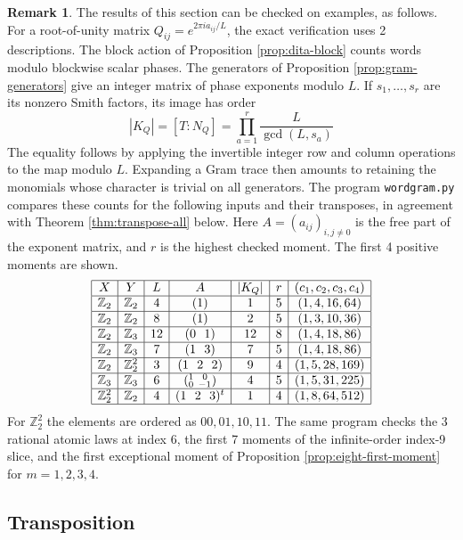 \documentclass[11pt,reqno]{amsart}
\theoremstyle{definition}
\newtheorem{remark}[thm]{Remark}
\numberwithin{equation}{section}
\begin{document}
\begin{remark}
The results of this section can be checked on examples, as follows. For a root-of-unity matrix $Q_{ij}=e^{2\pi i a_{ij}/L}$, the exact verification uses 2 descriptions. The block action of Proposition \ref{prop:dita-block} counts words modulo blockwise scalar phases. The generators of Proposition \ref{prop:gram-generators} give an integer matrix of phase exponents modulo $L$. If $s_1,\ldots,s_r$ are its nonzero Smith factors, its image has order
$$|K_Q|=[T:N_Q]=\prod_{a=1}^r\frac L{\gcd(L,s_a)}$$
The equality follows by applying the invertible integer row and column operations to the map modulo $L$. Expanding a Gram trace then amounts to retaining the monomials whose character is trivial on all generators. The program \texttt{wordgram.py} compares these counts for the following inputs and their transposes, in agreement with Theorem \ref{thm:transpose-all} below. Here $A=(a_{ij})_{i,j\neq0}$ is the free part of the exponent matrix, and $r$ is the highest checked moment. The first 4 positive moments are shown.
$$\begin{array}{|c|c|c|c|c|c|c|}\hline
X&Y&L&A&|K_Q|&r&(c_1,c_2,c_3,c_4)\\\hline
\mathbb Z_2&\mathbb Z_2&4&(1)&1&5&(1,4,16,64)\\\hline
\mathbb Z_2&\mathbb Z_2&8&(1)&2&5&(1,3,10,36)\\\hline
\mathbb Z_2&\mathbb Z_3&12&(0\ \ 1)&12&8&(1,4,18,86)\\\hline
\mathbb Z_2&\mathbb Z_3&7&(1\ \ 3)&7&5&(1,4,18,86)\\\hline
\mathbb Z_2&\mathbb Z_2^2&3&(1\ \ 2\ \ 2)&9&4&(1,5,28,169)\\\hline
\mathbb Z_3&\mathbb Z_3&6&(^1_0{\ }^{\ 0}_{-1})&4&5&(1,5,31,225)\\\hline
\mathbb Z_2^2&\mathbb Z_2&4&(1\ \ 2\ \ 3)^t&1&4&(1,8,64,512)\\\hline
\end{array}$$
For $\mathbb Z_2^2$ the elements are ordered as $00,01,10,11$. The same program checks the 3 rational atomic laws at index 6, the first 7 moments of the infinite-order index-9 slice, and the first exceptional moment of Proposition \ref{prop:eight-first-moment} for $m=1,2,3,4$.
\end{remark}

\subsection{Transposition}
\end{document}
